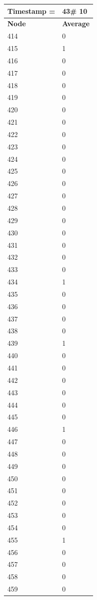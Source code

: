 \begin{tabular}{|l||l|}
\hline
\textbf{Timestamp =} & \textbf{43}\# 10\\\hline
	\textbf{Node} & \textbf{Average} \\ \hline
\hline
	414 & 0 \\ \hline
	415 & 1 \\ \hline
	416 & 0 \\ \hline
	417 & 0 \\ \hline
	418 & 0 \\ \hline
	419 & 0 \\ \hline
	420 & 0 \\ \hline
	421 & 0 \\ \hline
	422 & 0 \\ \hline
	423 & 0 \\ \hline
	424 & 0 \\ \hline
	425 & 0 \\ \hline
	426 & 0 \\ \hline
	427 & 0 \\ \hline
	428 & 0 \\ \hline
	429 & 0 \\ \hline
	430 & 0 \\ \hline
	431 & 0 \\ \hline
	432 & 0 \\ \hline
	433 & 0 \\ \hline
	434 & 1 \\ \hline
	435 & 0 \\ \hline
	436 & 0 \\ \hline
	437 & 0 \\ \hline
	438 & 0 \\ \hline
	439 & 1 \\ \hline
	440 & 0 \\ \hline
	441 & 0 \\ \hline
	442 & 0 \\ \hline
	443 & 0 \\ \hline
	444 & 0 \\ \hline
	445 & 0 \\ \hline
	446 & 1 \\ \hline
	447 & 0 \\ \hline
	448 & 0 \\ \hline
	449 & 0 \\ \hline
	450 & 0 \\ \hline
	451 & 0 \\ \hline
	452 & 0 \\ \hline
	453 & 0 \\ \hline
	454 & 0 \\ \hline
	455 & 1 \\ \hline
	456 & 0 \\ \hline
	457 & 0 \\ \hline
	458 & 0 \\ \hline
	459 & 0 \\ \hline
\end{tabular}
